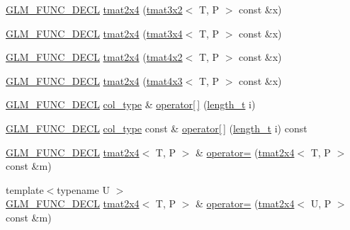 \begin{DoxyCompactItemize}
\item 
\hyperlink{setup_8hpp_ab2d052de21a70539923e9bcbf6e83a51}{G\+L\+M\+\_\+\+F\+U\+N\+C\+\_\+\+D\+E\+CL} \hyperlink{structglm_1_1detail_1_1tmat2x4_afc4a553b87823b8a974f0f9633fbe21b}{tmat2x4} (\hyperlink{structglm_1_1detail_1_1tmat3x2}{tmat3x2}$<$ T, P $>$ const \&x)
\item 
\hyperlink{setup_8hpp_ab2d052de21a70539923e9bcbf6e83a51}{G\+L\+M\+\_\+\+F\+U\+N\+C\+\_\+\+D\+E\+CL} \hyperlink{structglm_1_1detail_1_1tmat2x4_a4366b68e3fe9368c0b8815ffd54c2a86}{tmat2x4} (\hyperlink{structglm_1_1detail_1_1tmat3x4}{tmat3x4}$<$ T, P $>$ const \&x)
\item 
\hyperlink{setup_8hpp_ab2d052de21a70539923e9bcbf6e83a51}{G\+L\+M\+\_\+\+F\+U\+N\+C\+\_\+\+D\+E\+CL} \hyperlink{structglm_1_1detail_1_1tmat2x4_a758d4611a4d501821627c8bfbc4e842e}{tmat2x4} (\hyperlink{structglm_1_1detail_1_1tmat4x2}{tmat4x2}$<$ T, P $>$ const \&x)
\item 
\hyperlink{setup_8hpp_ab2d052de21a70539923e9bcbf6e83a51}{G\+L\+M\+\_\+\+F\+U\+N\+C\+\_\+\+D\+E\+CL} \hyperlink{structglm_1_1detail_1_1tmat2x4_a535452a34980c66d927256a8c5244fea}{tmat2x4} (\hyperlink{structglm_1_1detail_1_1tmat4x3}{tmat4x3}$<$ T, P $>$ const \&x)
\item 
\hyperlink{setup_8hpp_ab2d052de21a70539923e9bcbf6e83a51}{G\+L\+M\+\_\+\+F\+U\+N\+C\+\_\+\+D\+E\+CL} \hyperlink{structglm_1_1detail_1_1tmat2x4_a7324a2efc8a0f59f538568015bdda76b}{col\+\_\+type} \& \hyperlink{structglm_1_1detail_1_1tmat2x4_a6227fe9230c96905cd82b40fbbba833b}{operator\mbox{[}$\,$\mbox{]}} (\hyperlink{namespaceglm_a090a0de2260835bee80e71a702492ed9}{length\+\_\+t} i)
\item 
\hyperlink{setup_8hpp_ab2d052de21a70539923e9bcbf6e83a51}{G\+L\+M\+\_\+\+F\+U\+N\+C\+\_\+\+D\+E\+CL} \hyperlink{structglm_1_1detail_1_1tmat2x4_a7324a2efc8a0f59f538568015bdda76b}{col\+\_\+type} const  \& \hyperlink{structglm_1_1detail_1_1tmat2x4_a947815fa214797973eab5cd76e5b3534}{operator\mbox{[}$\,$\mbox{]}} (\hyperlink{namespaceglm_a090a0de2260835bee80e71a702492ed9}{length\+\_\+t} i) const
\item 
\hyperlink{setup_8hpp_ab2d052de21a70539923e9bcbf6e83a51}{G\+L\+M\+\_\+\+F\+U\+N\+C\+\_\+\+D\+E\+CL} \hyperlink{structglm_1_1detail_1_1tmat2x4}{tmat2x4}$<$ T, P $>$ \& \hyperlink{structglm_1_1detail_1_1tmat2x4_ac173ba8a4d80a63a46c3d883b9a53833}{operator=} (\hyperlink{structglm_1_1detail_1_1tmat2x4}{tmat2x4}$<$ T, P $>$ const \&m)
\item 
{\footnotesize template$<$typename U $>$ }\\\hyperlink{setup_8hpp_ab2d052de21a70539923e9bcbf6e83a51}{G\+L\+M\+\_\+\+F\+U\+N\+C\+\_\+\+D\+E\+CL} \hyperlink{structglm_1_1detail_1_1tmat2x4}{tmat2x4}$<$ T, P $>$ \& \hyperlink{structglm_1_1detail_1_1tmat2x4_a422287398bdb26f5d22bd9e91656889d}{operator=} (\hyperlink{structglm_1_1detail_1_1tmat2x4}{tmat2x4}$<$ U, P $>$ const \&m)

\end{DoxyCompactItemize}
